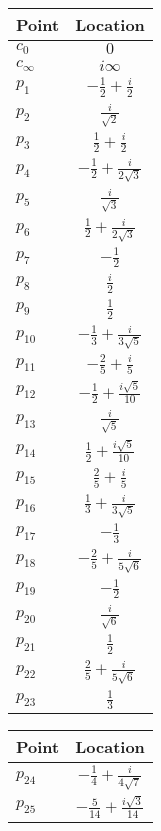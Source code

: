\documentclass[11pt,a4paper]{article}
\numberwithin{equation}{section}
\numberwithin{table}{section}\setlength{\multlinegap}{25pt}
\begin{document}
\begin{table}
\centering
\renewcommand{\arraystretch}{1.5}
    \begin{tabular}{lc}
    \toprule
    Point & Location\\
    \midrule
    $c_0$ & $0$\\
    $c_\infty$ & $i\infty$\\
    $p_1$ & $-\frac{1}{2}+\frac{i}{2}$\\
    $p_2$ & $\frac{i}{\sqrt{2}}$\\
    $p_3$ & $\frac{1}{2}+\frac{i}{2}$\\
    $p_4$ & $-\frac{1}{2}+\frac{i}{2\sqrt{3}}$\\
    $p_5$ & $\frac{i}{\sqrt{3}}$\\
    $p_6$ & $\frac{1}{2}+\frac{i}{2\sqrt{3}}$\\
    $p_7$ & $-\frac{1}{2}$\\
    $p_8$ & $\frac{i}{2}$\\
    $p_9$ & $\frac{1}{2}$\\
    $p_{10}$ & $-\frac{1}{3}+\frac{i}{3\sqrt{5}}$\\
    $p_{11}$ & $-\frac{2}{5}+\frac{i}{5}$\\
    $p_{12}$ & $-\frac{1}{2}+\frac{i\sqrt{5}}{10}$\\
    $p_{13}$ & $\frac{i}{\sqrt{5}}$\\
    $p_{14}$ & $\frac{1}{2}+\frac{i\sqrt{5}}{10}$\\
    $p_{15}$ & $\frac{2}{5}+\frac{i}{5}$\\
    $p_{16}$ & $\frac{1}{3}+\frac{i}{3\sqrt{5}}$\\
    $p_{17}$ & $-\frac13$\\
    $p_{18}$ & $-\frac{2}{5}+\frac{i}{5\sqrt{6}}$\\
    $p_{19}$ & $-\frac12$\\
    $p_{20}$ & $\frac{i}{\sqrt{6}}$\\
    $p_{21}$ & $\frac12$\\
    $p_{22}$ & $\frac{2}{5}+\frac{i}{5\sqrt{6}}$\\
    $p_{23}$ & $\frac13$\\
    \bottomrule
    \end{tabular}\hspace{1ex}
    \begin{tabular}{lc}
    \toprule
    Point & Location\\
    \midrule
    $p_{24}$ & $-\frac{1}{4}+\frac{i}{4\sqrt{7}}$\\
    $p_{25}$ & $-\frac{5}{14}+\frac{i\sqrt{3}}{14}$\\

\end{tabular}
\end{table}
\end{document}
